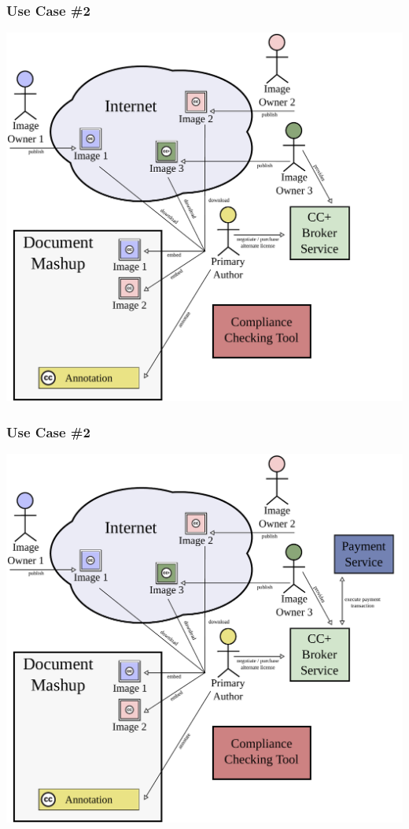 \documentclass[mathserif,xcolor=dvipsnames,hyperref={bookmarks=true}]{beamer}
\begin{document}
    \begin{frame}[t]
        \frametitle{Use Case \#2}
        \begin{center}
            \includegraphics[width=0.9\textheight]{../resources/usecases/usecase2/usecase2-step32.pdf}
        \end{center}
    \end{frame}
    \begin{frame}[t]
        \frametitle{Use Case \#2}
        \begin{center}
            \includegraphics[width=0.9\textheight]{../resources/usecases/usecase2/usecase2-step33.pdf}
        \end{center}
    \end{frame}
\end{document}
